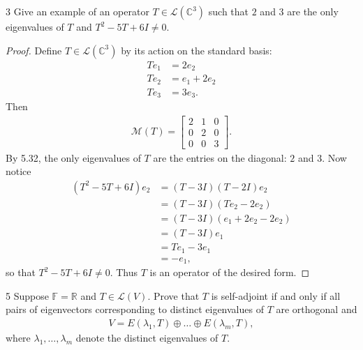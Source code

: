 \documentclass{extarticle}
\newenvironment{problem}[1]{\begin{prob*}{#1}{}}{\end{prob*}}
\newcommand{\R}{\mathbb{R}}
\newcommand{\C}{\mathbb{C}}
\newcommand{\F}{\mathbb{F}}
\newcommand{\mat}{\mathcal{M}}
\newcommand{\Hom}{\mathcal{L}}
\begin{document}
\begin{problem}{3}
Give an example of an operator $T\in\Hom(\C^3)$ such that $2$ and $3$ are the only eigenvalues of $T$ and $T^2 - 5T + 6I \neq 0$.
\end{problem}
\begin{proof}
Define $T\in\Hom(\C^3)$ by its action on the standard basis:
\begin{align*}
Te_1 &= 2e_2\\
Te_2 &= e_1 + 2e_2\\
Te_3 &= 3e_3.
\end{align*}
Then 
\begin{align*}
\mat(T) = \begin{bmatrix}2 & 1 & 0\\ 0 & 2 & 0\\ 0 & 0 & 3\end{bmatrix}.
\end{align*}
By 5.32, the only eigenvalues of $T$ are the entries on the diagonal: $2$ and $3$.  Now notice
\begin{align*}
(T^2 - 5T + 6I)e_2 &= (T - 3I)(T - 2I)e_2\\
&= (T - 3I)(Te_2 - 2e_2)\\
&= (T - 3I)(e_1 + 2e_2 - 2e_2)\\
&= (T - 3I)e_1\\
&= Te_1 - 3e_1\\
&= -e_1,
\end{align*}
so that $T^2 - 5T + 6I\neq 0$.  Thus $T$ is an operator of the desired form.
\end{proof}

\begin{problem}{5}
Suppose $\F=\R$ and $T\in\Hom(V)$.  Prove that $T$ is self-adjoint if and only if all pairs of eigenvectors corresponding to distinct eigenvalues of $T$ are orthogonal and 
\begin{align*}
V = E(\lambda_1, T)\oplus \dots \oplus E(\lambda_m, T),
\end{align*}
where $\lambda_1,\dots,\lambda_m$ denote the distinct eigenvalues of $T$.
\end{problem}
\end{document}
